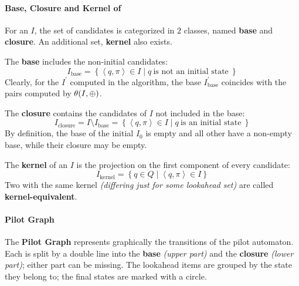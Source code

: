 \documentclass[english]{article}
\begin{document}
\paragraph[Base, Closure and Kernel of m-state]{Base, Closure and Kernel of \mstate}
\label{par:base-closure-kernel}

For an \mstate \(I\), the set of candidates is categorized in \(2\) classes, named \textbf{base} and \textbf{closure}.
An additional set, \textbf{kernel} also exists.

\begin{definition}
  The \textbf{base} includes the non-initial candidates:
  \[ I_{\text{base}} = \left\{ \left\langle q, \pi \right\rangle \in I \mid q \ \text{is not an initial state} \ \right\} \]
  Clearly, for the \mstate \(I^\prime\) computed in the algorithm, the base \(I^\prime_{\text{base}}\) coincides with the pairs computed by \(\theta(I, \oplus)\).
\end{definition}

\begin{definition}
  The \textbf{closure} contains the candidates of \(I\) not included in the base:
  \[ I_{\text{closure}} = I \setminus I_{\text{base}} = \left\{ \left\langle q , \pi \right\rangle \in I \mid q \ \text{is an initial state} \ \right\} \]
  By definition, the base of the initial \mstate \(I_0\) is empty and all other \mstates have a non-empty base, while their closure may be empty.
\end{definition}

\begin{definition}
  The \textbf{kernel} of an \mstate \(I\) is the projection on the first component of every candidate:
  \[ I_{\text{kernel}} = \left\{ q \in Q \mid \left\langle q, \pi \right\rangle \in I \right\} \]
  Two \mstates with the same kernel \textit{(differing just for some lookahead set)} are called \textbf{kernel-equivalent}.
\end{definition}

\paragraph{Pilot Graph}

The \textbf{Pilot Graph} represents graphically the transitions of the pilot automaton.
Each \mstate is split by a double line into the \textbf{base} \textit{(upper part)} and the \textbf{closure} \textit{(lower part)};
either part can be missing.
The lookahead items are grouped by the state they belong to;
the final states are marked with a circle.
\end{document}
